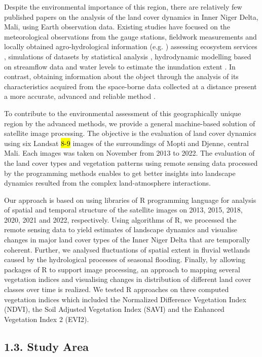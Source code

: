\documentclass[12pt,a4paper,oneside]{article}
\def \newpar{\vspace{6pt}}
\begin{document}
\newpar Despite the environmental importance of this region, there are relatively few published papers on the analysis of the land cover dynamics in Inner Niger Delta, Mali, using Earth observation data. Existing studies have focused on the meteorological observations from the gauge stations, fieldwork measurements and locally obtained agro-hydrological information (e.g. \citep{dadson2010wetland}) assessing ecosystem services \citep{REBELO201358}, simulations of datasets by statistical analysis \cite{Mascaro}, hydrodynamic modelling based on streamflow data and water levels to estimate the inundation extent \citep{HAQUE2020100703,HAQUE2021104187}. In contrast, obtaining information about the object through the analysis of its characteristics acquired from the space-borne data collected at a distance present a more accurate, advanced and reliable method \citep{Maini,rs70202127}. 

To contribute to the environmental assessment of this geographically unique region by the advanced methods, we provide a general machine-based solution of satellite image processing. The objective is the evaluation of land cover dynamics using six Landsat \hl{8-9} images of the surroundings of Mopti and Djenne, central Mali. Each images was taken on November from 2013 to 2022. The evaluation of the land cover types and vegetation patterns using remote sensing data processed by the programming methods enables to get better insights into landscape dynamics resulted from the complex land-atmosphere interactions.

\newpar Our approach is based on using libraries of R programming language for analysis of spatial and temporal structure of the satellite images on 2013, 2015, 2018, 2020, 2021 and 2022, respectively. Using algorithms of R, we processed the remote sensing data to yield estimates of landscape dynamics and visualise changes in major land cover types of the Inner Niger Delta that are temporally coherent. Further, we analysed fluctuations of spatial extent in fluvial wetlands caused by the hydrological processes of seasonal flooding. Finally, by allowing packages of R to support image processing, an approach to mapping several vegetation indices and visualising changes in distribution of different land cover classes over time is realized. We tested R approaches on three computed vegetation indices which included the Normalized Difference Vegetation Index (NDVI), the Soil Adjusted Vegetation Index (SAVI) and the Enhanced Vegetation Index 2 (EVI2).

\subsection*{1.3. Study Area}
\end{document}
